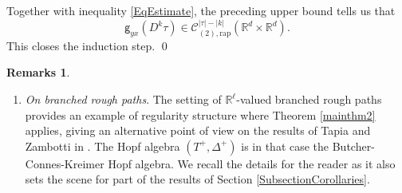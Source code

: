 \documentclass[JEP,XML,SOM,Unicode,published]{cedram}
\theoremstyle{plain}
\theoremstyle{definition}
\newtheorem*{remarks*} {Remarks}
\newcommand{\rap}{\mathrm{rap}}
\newcommand{\sfg}{\mathsf{g}}
\newcommand{\bbR}{\mathbb{R}}
\newcommand{\mcC}{\mathcal{C}}
\begin{document}
Together with inequality \eqref{EqEstimate}, the preceding upper bound tells us that\vspace*{-3pt}
\[
{\sfg}_{yx}(D^k\tau)\in\mcC^{|\tau|-|k|}_{(2),\rap}(\bbR^d\times\bbR^d).
\]
This closes the induction step. \qed

\skpt
\begin{remarks*}
\begin{enumerate}
\item
\emph{On branched rough paths}. The setting of $\bbR^\ell$-valued branched rough paths provides an example of regularity structure where Theorem \ref{mainthm2} applies, giving an alternative point of view on the results of Tapia and Zambotti in \cite{TZ18}. The Hopf algebra $(T^+,\Delta^+)$ is in that case the Butcher-Connes-Kreimer Hopf algebra. We recall the details for the reader as it also sets the scene for part of the results of Section \ref{SubsectionCorollaries}.


\end{enumerate}
\end{remarks*}
\end{document}
